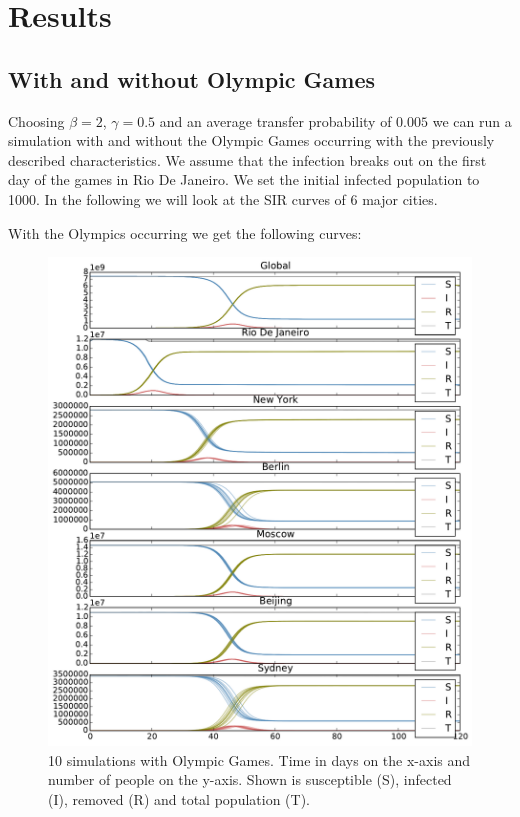 \section{Results}
\subsection{With and without Olympic Games}
Choosing $\beta=2$, $\gamma=0.5$ and an average transfer probability of $0.005$ we can run a simulation with and without the Olympic Games occurring with the previously described characteristics. We assume that the infection breaks out on the first day of the games in Rio De Janeiro. We set the initial infected population to 1000. In the following we will look at the SIR curves of 6 major cities.

With the Olympics occurring we get the following curves:
\begin{figure}[H]
	\centering
	\includegraphics[width=1.0 \linewidth]{plots/rio-0-18-380000.pdf}
	\caption{10 simulations with Olympic Games. Time in days on the x-axis and number of people on the y-axis. Shown is susceptible (S), infected (I), removed (R) and total population (T).}
	\label{fig:rio-0-18-380000}
\end{figure}

